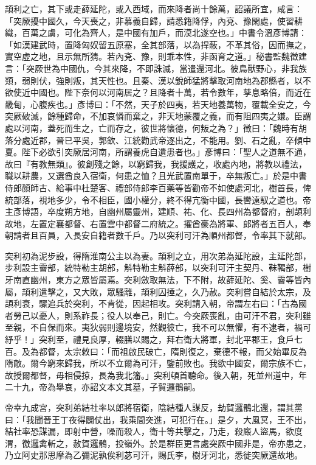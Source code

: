 \begin{pinyinscope}
 頡利之亡，其下或走薛延陀，或入西域，而來降者尚十餘萬，詔議所宜，咸言：「突厥擾中國久，今天喪之，非慕義自歸，請悉籍降俘，內兗、豫閑處，使習耕織，百萬之虜，可化為齊人，是中國有加戶，而漠北遂空也。」中書令溫彥博請：「如漢建武時，置降匈奴留五原塞，全其部落，以為捍蔽，不革其俗，因而撫之，實空虛之地，且示無所猜。若內兗、豫，則乖本性，非函育之道。」秘書監魏徵建言：「突厥世為中國仇，今其來降，不即誅滅，當遣還河北。彼鳥獸野心，非我族類，弱則伏，強則叛，其天性也。且秦、漢以銳師猛將擊取河南地為郡縣者，以不欲使近中國也。陛下奈何以河南居之？且降者十萬，若令數年，孳息略倍，而近在畿甸，心腹疾也。」彥博曰：「不然，天子於四夷，若天地養萬物，覆載全安之，今突厥破滅，餘種歸命，不加哀憐而棄之，非天地蒙覆之義，而有阻四夷之嫌。臣謂處以河南，蓋死而生之，亡而存之，彼世將懷德，何叛之為？」徵曰：「魏時有胡落分處近郡，晉已平吳，郭欽、江統勸武帝逐出之，不能用。劉、石之亂，卒傾中夏。陛下必欲引突厥居河南，所謂養虎自遺患者也。」彥博曰：「聖人之道無不通，故曰『有教無類』。彼創殘之餘，以窮歸我，我援護之，收處內地，將教以禮法，職以耕農，又選酋良入宿衛，何患之恤？且光武置南單于，卒無叛亡。」於是中書侍郎顏師古、給事中杜楚客、禮部侍郎李百藥等皆勸帝不如使處河北，樹首長，俾統部落，視地多少，令不相臣，國小權分，終不得亢衡中國，長轡遠馭之道也。帝主彥博語，卒度朔方地，自幽州屬靈州，建順、祐、化、長四州為都督府，剖頡利故地，左置定襄都督、右置雲中都督二府統之。擢酋豪為將軍、郎將者五百人，奉朝請者且百員，入長安自籍者數千戶。乃以突利可汗為順州都督，令率其下就部。



 突利初為泥步設，得隋淮南公主以為妻。頡利之立，用次弟為延陀設，主延陀部，步利設主霫部，統特勒主胡部，斛特勒主斛薛部，以突利可汗主契丹、靺鞨部，樹牙南直幽州，東方之眾皆屬焉。突利斂取無法，下不附，故薛延陀、奚、霫等皆內屬，頡利遣擊之，又大敗，眾騷離，頡利囚捶之，久乃赦。突利嘗自結於太宗，及頡利衰，驟追兵於突利，不肯從，因起相攻。突利請入朝，帝謂左右曰：「古為國者勞己以憂人，則系祚長；役人以奉己，則亡。今突厥喪亂，由可汗不君，突利雖至親，不自保而來。夷狄弱則邊境安，然觀彼亡，我不可以無懼，有不逮者，禍可紓乎！」突利至，禮見良厚，輟膳以賜之，拜右衛大將軍，封北平郡王，食戶七百。及為都督，太宗敕曰：「而祖啟民破亡，隋則復之，棄德不報，而父始畢反為隋敵。爾今窮來歸我，所以不立爾為可汗，鑒前敗也。我欲中國安，爾宗族不亡，故授爾都督，毋相侵掠，長為我北籓。」突利頓首聽命。後入朝，死並州道中，年二十九，帝為舉哀，亦詔文本文其墓，子賀邏鶻嗣。



 帝幸九成宮，突利弟結社率以郎將宿衛，陰結種人謀反，劫賀邏鶻北還，謂其黨曰：「我聞晉王丁夜得闢仗出，我乘間突進，可犯行在。」是夕，大風冥，王不出，結社率恐謀漏，即射中營，噪而殺人，衛十等共擊之，乃走，殺廄人盜馬，欲度渭，徼邏禽斬之，赦賀邏鶻，投嶺外。於是群臣更言處突厥中國非是，帝亦患之，乃立阿史那思摩為乙彌泥孰俟利苾可汗，賜氏李，樹牙河北，悉徙突厥還故地。




\end{pinyinscope}
